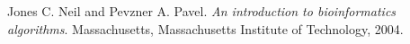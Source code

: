 \documentclass[twoside,openright,titlepage,fleqn,
,	headinclude,12pt,a4paper,BCOR5mm,footinclude,table]{scrbook}
\begin{document}
\frenchspacing
\raggedbottom
{}
\pagestyle{plain}




\pagestyle{scrheadings}
%
%
%
\tableofcontents
\listoftables
\listoffigures



\begin{thebibliography}{50}

Jones C. Neil and Pevzner A. Pavel.
\textit{An introduction to bioinformatics algorithms}.
Massachusetts, Massachusetts Institute of Technology, 2004.

\end{thebibliography}



\end{document}
